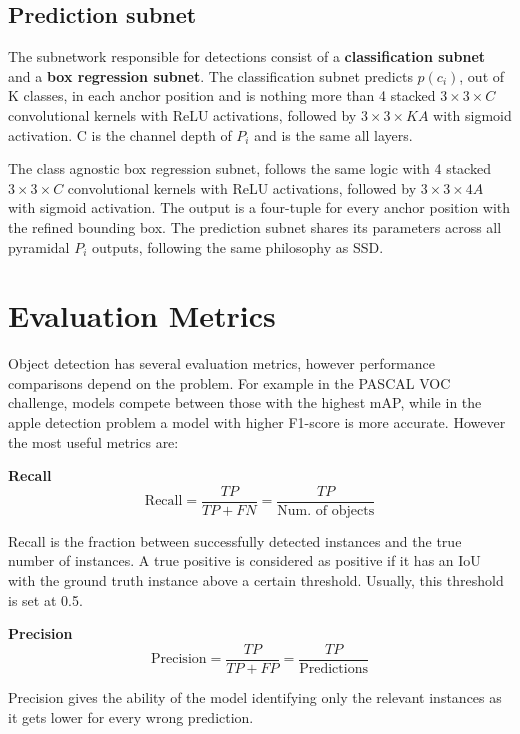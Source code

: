 \subsection{Prediction subnet}
The subnetwork responsible for detections consist of a \textbf{classification subnet} and a \textbf{box regression subnet}. The classification subnet predicts $p(c_i)$, out of K classes, in each anchor position and is nothing more than 4 stacked $3\times3\times C$ convolutional kernels with ReLU activations, followed by  $3\times3\times KA$ with sigmoid activation. C is the channel depth of $P_i$ and is the same all layers.

The class agnostic box regression subnet, follows the same logic with 4 stacked $3\times3\times C$ convolutional kernels with ReLU activations, followed by $3\times3\times 4A$ with sigmoid activation. The output is a four-tuple for every anchor position with the refined bounding box. The prediction subnet shares its parameters across all pyramidal $P_i$ outputs, following the same philosophy as SSD.

\section{Evaluation Metrics}
Object detection has several evaluation metrics, however performance comparisons depend on the problem. For example in the PASCAL VOC challenge, models compete between those with the highest mAP, while in the apple detection problem a model with higher F1-score is more accurate. However the most useful metrics are:

\bigskip
\textbf{Recall}
\bigskip\noindent
\begin{equation}
  \text{Recall} = \frac{TP}{TP+FN}=\frac{TP}{\text{Num. of objects}}
\end{equation} 

Recall is the fraction between successfully detected instances and the true number of instances. A true positive is considered as positive if it has an IoU with the ground truth instance above a certain threshold. Usually, this threshold is set at 0.5.

\bigskip
\textbf{Precision}
\bigskip\noindent
\begin{equation}
  \text{Precision} = \frac{TP}{TP+FP}=\frac{TP}{\text{Predictions}}
\end{equation} 

Precision gives the ability of the model identifying only the relevant instances as it gets lower for every wrong prediction.

